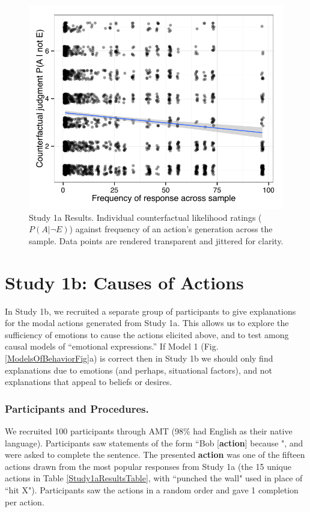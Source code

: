 \documentclass[10pt,letterpaper]{article}
\begin{document}
\begin{figure}[htb!]
\begin{center}
	\includegraphics[width=0.80\columnwidth]{images/study1a_results.pdf}
\end{center}
\caption{ Study 1a Results. Individual counterfactual likelihood ratings ($P(A | \neg E)$) against frequency of an action's generation across the sample. Data points are rendered transparent and jittered for clarity. }
\label{Study1aResultsFig}
\end{figure}


\section{Study 1b: Causes of Actions}

In Study 1b, we recruited a separate group of participants to give explanations for the modal actions generated from Study 1a. 
This allows us to explore the sufficiency of emotions to cause the actions elicited above, and to test among causal models of ``emotional expressions.''
If Model 1 (Fig. \ref{ModelsOfBehaviorFig}a) is correct then in Study 1b we should only find explanations due to emotions (and perhaps, situational factors), and not explanations that appeal to beliefs or desires.


\subsubsection{Participants and Procedures.} 
We recruited 100 participants through AMT (98\% had English as their native language). Participants saw statements of the form ``Bob [\textbf{action}] because \underline{\hspace{2em}}", and were asked to complete the sentence. The presented \textbf{action} was one of the fifteen actions drawn from the most popular responses from Study 1a (the 15 unique actions in Table \ref{Study1aResultsTable}, with ``punched the wall" used in place of ``hit X"). Participants saw the actions in a random order and gave 1 completion per action.
\end{document}
